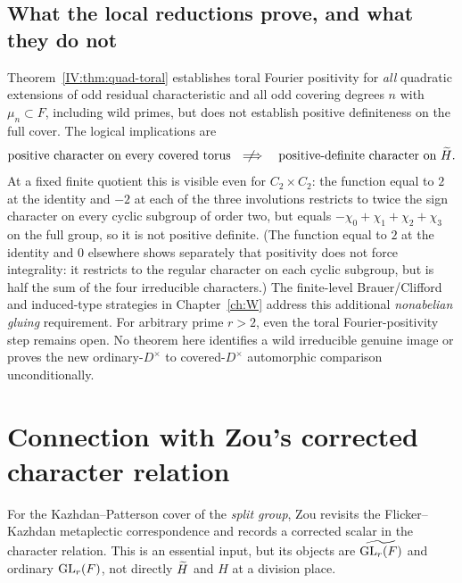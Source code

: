 \subsection{What the local reductions prove, and what they do not}
\label{IV:subsec:strategywild}
Theorem~\ref{IV:thm:quad-toral} establishes toral Fourier positivity
for \emph{all} quadratic extensions of odd residual characteristic
and all odd covering degrees $n$ with $\mu_n\subset F$, including
wild primes, but does not establish positive
definiteness on the full cover.  The logical implications are
\[
\text{positive character on every covered torus}
\quad\not\!\!\Longrightarrow\quad
\text{positive-definite character on }\widetilde H.
\]
At a fixed finite quotient this is visible even for
$C_2\times C_2$: the function equal to $2$ at the identity
and $-2$ at each of the three involutions restricts to twice
the sign character on every cyclic subgroup of order two, but
equals $-\chi_0+\chi_1+\chi_2+\chi_3$ on the full group, so it
is not positive definite.  (The function equal to $2$ at the
identity and $0$ elsewhere shows separately that positivity
does not force integrality: it restricts to the regular
character on each cyclic subgroup, but is half the sum of the
four irreducible characters.)
The finite-level Brauer/Clifford and induced-type strategies in
Chapter~\ref{ch:W} address this additional \emph{nonabelian gluing}
requirement.  For arbitrary prime $r>2$, even the toral
Fourier-positivity step remains open.
No theorem here identifies a wild irreducible genuine image or
proves the new ordinary-$D^\times$ to covered-$D^\times$
automorphic comparison unconditionally.

\section{Connection with Zou's corrected character relation}\label{IV:sec:Zou}
For the Kazhdan--Patterson cover of the \emph{split group},
Zou \cite[\S3]{Zo23} revisits the Flicker--Kazhdan metaplectic
correspondence and records a corrected scalar in the character
relation.  This is an essential input, but its objects are
$\widetilde{\operatorname{GL}_r(F)}$ and ordinary $\operatorname{GL}_r(F)$, not directly
$\widetilde H$ and $H$ at a division place.

